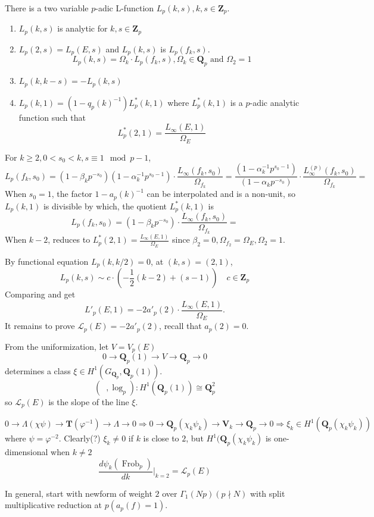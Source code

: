 \documentclass[leqno]{amsart}
\DeclareMathOperator{\ordp}{{ord}_p}
\DeclareMathOperator{\Frob}{Frob}
\newcommand{\Qp}{\mathbf{Q}_p}
\newcommand{\Zp}{\mathbf{Z}_p}
\newcommand{\1}{\mathbf{1}}
\theoremstyle{definition}
\theoremstyle{remark}
\begin{document}
There is a two variable $p$-adic L-function $L_p(k,s), k,s\in \Zp$.
 \begin{enumerate}[label=(\alph*)]
	 \item $L_p(k,s)$ is analytic for  $k,s\in \Zp$
	 \item  $L_p(2,s)=L_p(E,s)$ and 
		 $L_p(k,s)$ is  $L_p(f_k,s)$.
		 \[
			 L_p(k,s)=\Omega_k\cdot L_p(f_k,s),\Omega_k\in \Qp
			 \text{ and } \Omega_2=1
		 \]
	 \item  $L_p(k,k-s)=-L_p(k,s)$
	 \item  $L_p(k,1)=(1-q_p(k)^{-1})L_p^*(k,1)$
		 where  $L_p^*(k,1)$ is a  $p$-adic analytic function 
		 such that 
		 \[
			 L^*_p(2,1)=\frac{L_\infty(E,1)}{\Omega_E}
		 \]
\end{enumerate}
 For $k\geq2, 0<s_0<k, s\equiv 1\mod p-1$,
  \[
	  L_p(f_k,s_0)=
	  (1-\beta_kp^{-s_0})(1-\alpha_k^{-1}p^{s_0-1})
	  \cdot \frac{L_\infty(f_k,s_0)}{\Omega_{f_k}}=
	  \frac{(1-\alpha_k^{-1}p^{s_0-1})}{(1-\alpha_kp^{-s_0})}
	  \cdot \frac{L^{(p)}_\infty(f_k,s_0)}{\Omega_{f_k}}=
 \]
When $s_0=1$, the factor 
$1-a_p(k)^{-1}$ can be interpolated and is a non-unit,
so $L_p(k,1)$ is divisible by which, the quotient 
$L_p^*(k,1)$ is 
\[
	  L_p(f_k,s_0)=
	  (1-\beta_kp^{-s_0})
	  \cdot \frac{L_\infty(f_k,s_0)}{\Omega_{f_k}}=
\]
When $k-2$, reduces to
$L_p^*(2,1)=\frac{L_\infty(E,1)}{\Omega_E}$ since 
$\beta_2=0,\Omega_{f_2}=\Omega_E, \Omega_2=1$.

By functional equation $L_p(k,k/2)=0$,
at  $(k,s)=(2,1)$,
 \[
	 L_p(k,s)\sim c\cdot (-\frac{1}{2}(k-2)+(s-1))\quad c\in \Zp
\]
Comparing and get 
\[
	L'_p(E,1)=-2a'_p(2)\cdot 
	\frac{L_\infty(E,1)}{\Omega_E}.
\]
It remains to prove $\mathcal{L}_p(E)=-2a'_p(2)$,
recall that  $a_p(2)=0$.

From the uniformization, let $V=V_p(E)$
 \[
	 0\to \Qp(1)\to V\to \Qp\to 0
\]
determines a class $\xi\in H^1(G_{\Qp},\Qp(1))$.
\[
	(\ordp,\log_p)\colon H^1(\Qp(1))\cong \Qp^2
\]
so $\mathcal{L}_p(E)$ is the slope of the line  $\xi$.

 \[
	 0\to \Lambda(\chi\psi)\to \mathbf{T}(\varphi^{-1})\to \Lambda\to 0
	 \Longrightarrow
	 0\to \Qp(\chi_k\psi_k)\to \mathbf{V}_k\to \Qp\to 0
	 \Longrightarrow
	 \xi_k\in H^1(\Qp(\chi_k\psi_k))
\]
where $\psi=\varphi^{-2}$.
Clearly(?) $\xi_k\neq 0$ if  $k$ is close to  $2$,
but $H^1(\Qp(\chi_k\psi_k)$ is one-dimensional  when $k\neq 2$ 
\[
	\frac{d\psi_k(\Frob_p)}{dk}\vert_{k=2}=\mathcal{L}_p(E)
\]

In general, 
start with newform of weight $2$ over  $\Gamma_1(Np)(p\nmid N)$
with split multiplicative reduction at $p(a_p(f)=1)$. 


%
%
\end{document}
